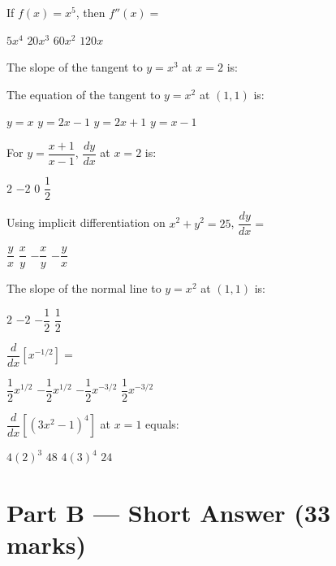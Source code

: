 \documentclass[addpoints]{exam}
\begin{document}
\begin{questions}
\question[1] If $f(x) = x^5$, then $f''(x) = $
\begin{choices}
    \choice $5x^4$
    \correctchoice $20x^3$
    \choice $60x^2$
    \choice $120x$
\end{choices}

\question[1] The slope of the tangent to $y = x^3$ at $x = 2$ is:
\begin{choices}
\end{choices}

\question[1] The equation of the tangent to $y = x^2$ at $(1, 1)$ is:
\begin{choices}
    \choice $y = x$
    \correctchoice $y = 2x - 1$
    \choice $y = 2x + 1$
    \choice $y = x - 1$
\end{choices}

\question[1] For $y = \dfrac{x+1}{x-1}$, $\dfrac{dy}{dx}$ at $x = 2$ is:
\begin{choices}
    \choice $2$
    \correctchoice $-2$
    \choice $0$
    \choice $\dfrac{1}{2}$
\end{choices}

\question[1] Using implicit differentiation on $x^2 + y^2 = 25$, $\dfrac{dy}{dx} = $
\begin{choices}
    \choice $\dfrac{y}{x}$
    \choice $\dfrac{x}{y}$
    \correctchoice $-\dfrac{x}{y}$
    \choice $-\dfrac{y}{x}$
\end{choices}

\question[1] The slope of the normal line to $y = x^2$ at $(1, 1)$ is:
\begin{choices}
    \choice $2$
    \choice $-2$
    \correctchoice $-\dfrac{1}{2}$
    \choice $\dfrac{1}{2}$
\end{choices}

\question[1] $\dfrac{d}{dx}\!\left[x^{-1/2}\right] = $
\begin{choices}
    \choice $\dfrac{1}{2}x^{1/2}$
    \choice $-\dfrac{1}{2}x^{1/2}$
    \correctchoice $-\dfrac{1}{2}x^{-3/2}$
    \choice $\dfrac{1}{2}x^{-3/2}$
\end{choices}

\question[1] $\dfrac{d}{dx}\!\left[(3x^2 - 1)^4\right]$ at $x = 1$ equals:
\begin{choices}
    \choice $4(2)^3$
    \correctchoice $48$
    \choice $4(3)^4$
    \choice $24$
\end{choices}


\section*{Part B --- Short Answer (33 marks)}


\end{questions}
\end{document}
